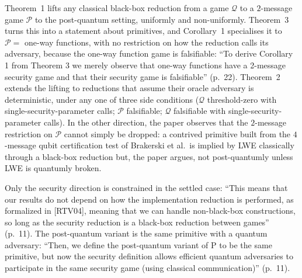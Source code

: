 \documentclass{aicr-conjecture}
\newcommand{\Pc}{\mathcal{P}}
\newcommand{\Qc}{\mathcal{Q}}
\begin{document}
\begin{remark}\label{rem:progress}
Theorem~1 lifts any classical black-box reduction from a game $\Qc$ to a
$2$-message game $\Pc$ to the post-quantum setting, uniformly and
non-uniformly. Theorem~3 turns this into a statement about primitives,
and Corollary~1 specialises it to $\Pc = {}$ one-way functions, with no
restriction on how the reduction calls its adversary, because the one-way
function game is falsifiable: ``To derive Corollary 1 from Theorem 3 we
merely observe that one-way functions have a 2-message security game and
that their security game is falsifiable'' (p.~22). Theorem~2 extends the
lifting to reductions that assume their oracle adversary is
deterministic, under any one of three side conditions ($\Qc$
threshold-zero with single-security-parameter calls; $\Pc$ falsifiable;
$\Qc$ falsifiable with single-security-parameter calls). In the other
direction, the paper observes that the $2$-message restriction on $\Pc$
cannot simply be dropped: a contrived primitive built from the
$4$-message qubit certification test of Brakerski et al.\ is implied by
LWE classically through a black-box reduction but, the paper argues, not
post-quantumly unless LWE is quantumly broken.
\end{remark}

\begin{remark}\label{rem:scope}
Only the security direction is constrained in the settled case: ``This
means that our results do not depend on how the implementation reduction
is performed, as formalized in [RTV04], meaning that we can handle
non-black-box constructions, so long as the security reduction is a
black-box reduction between games'' (p.~11). The post-quantum variant is
the same primitive with a quantum adversary: ``Then, we define the
post-quantum variant of P to be the same primitive, but now the security
definition allows efficient quantum adversaries to participate in the
same security game (using classical communication)'' (p.~11).
\end{remark}
\end{document}
